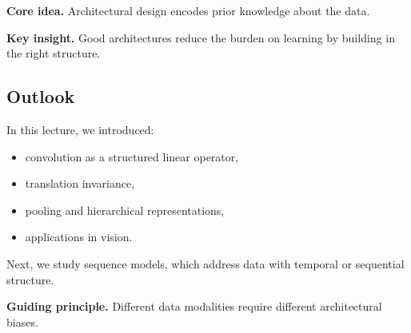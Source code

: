 \medskip

\noindent
\textbf{Core idea.}  
Architectural design encodes prior knowledge about the data.

\medskip

\noindent
\textbf{Key insight.}  
Good architectures reduce the burden on learning by building in the right structure.

\subsection{Outlook}

In this lecture, we introduced:

\begin{itemize}
    \item convolution as a structured linear operator,
    \item translation invariance,
    \item pooling and hierarchical representations,
    \item applications in vision.
\end{itemize}

\medskip

\noindent
Next, we study sequence models, which address data with temporal or sequential structure.

\medskip

\noindent
\textbf{Guiding principle.}  
Different data modalities require different architectural biases.